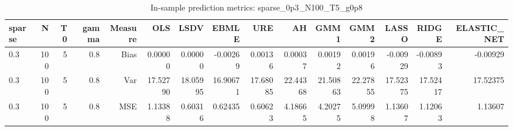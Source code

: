 \begin{table}[!htbp]\centering
\caption{In-sample prediction metrics: sparse_0p3_N100_T5_g0p8}
\label{tab:table2_sparse_0p3_N100_T5_g0p8}
\begin{tabular}{lrrrrrrrrrrrrrr}
\hline
sparse & N & T0 & gamma & Measure & OLS & LSDV & EBMLE & URE & AH & GMM1 & GMM2 & LASSO & RIDGE & ELASTIC_NET \\
\hline
0.3 & 100 & 5 & 0.8 & Bias & 0.00000 & 0.00000 & -0.00269 & 0.00136 & 0.00037 & 0.00192 & 0.00196 & -0.00929 & -0.00893 & -0.00929 \\
0.3 & 100 & 5 & 0.8 & Var & 17.52790 & 18.05995 & 16.90671 & 17.68085 & 22.44368 & 21.50863 & 22.27855 & 17.52375 & 17.52417 & 17.52375 \\
0.3 & 100 & 5 & 0.8 & MSE & 1.13388 & 0.60316 & 0.62435 & 0.60623 & 4.18665 & 4.20275 & 5.09998 & 1.13607 & 1.12063 & 1.13607 \\
\hline
\end{tabular}
\end{table}


